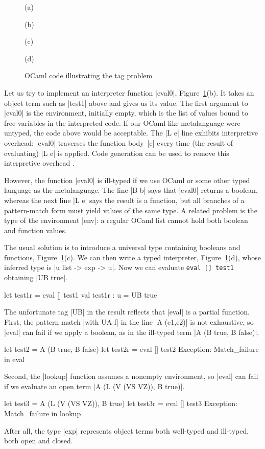 \begin{figure}
%
(a) 

\smallskip
(b) 

\smallskip
(c) 

\smallskip
(d) 

\medskip
\caption{OCaml code illustrating the tag problem}
\label{fig:tag-problem}
\end{figure}

\fi
Let us try to implement an interpreter function |eval0|\ifshort,
Figure~\ref{fig:tag-problem}(b)\fi. It takes
an object term such as |test1| above and gives us its value.
The first argument to |eval0| is the environment, initially empty,
which is the list of values bound to free variables in the
interpreted code.
\ifshort\else{}\fi
If our OCaml-like metalanguage were untyped, the code above would be 
acceptable.
The |L e| line exhibits interpretive overhead:
|eval0| traverses the function body~|e| every time (the result of
evaluating) |L e| is applied. Code generation can be used to remove this
interpretive overhead \citep{jones-partial,futamura-partial,WalidICFP02}.

However, the function |eval0| is ill-typed
if we use OCaml or some other typed language as the metalanguage.
The line |B b|
says that |eval0| returns a boolean, whereas the next line |L e| says
the result is a function, but all branches of a pattern-match form must
yield values of the same type. 
A related problem is the type of the environment |env|: a regular
OCaml list cannot hold both boolean and function values. 

The usual solution is to introduce a universal type
containing booleans and functions\ifshort,
Figure~\ref{fig:tag-problem}(c)\fi.
\ifshort\else{}\fi
We can then write a typed interpreter\ifshort,
Figure~\ref{fig:tag-problem}(d), \else{}\fi
whose inferred type is |u list -> exp -> u|. Now we can evaluate
\ifshort
\texttt{eval [] test1} obtaining |UB true|.
\else
\begin{code}
let test1r = eval [] test1
val test1r : u = UB true 
\end{code}
\fi
The unfortunate tag |UB| in the result reflects that |eval| is a partial
function.  
First, the pattern match |with UA f| in the line
|A (e1,e2)| is not exhaustive, so |eval| can fail if we apply a boolean,
as in the ill-typed term |A (B true, B false)|.
\ifshort\else
\begin{code}
let test2 = A (B true, B false)
let test2r = eval [] test2
Exception: Match_failure in eval
\end{code}
\fi
Second, the |lookup|
function assumes a nonempty environment, so |eval| can fail if we
evaluate an open term
\ifshort
|A (L (V (VS VZ)), B true)|.
\else
\begin{code}
let test3 = A (L (V (VS VZ)), B true)
let test3r = eval [] test3
Exception: Match_failure in lookup
\end{code}
\fi
After all, the type |exp| represents object
terms both well-typed and ill-typed, both open and closed.

